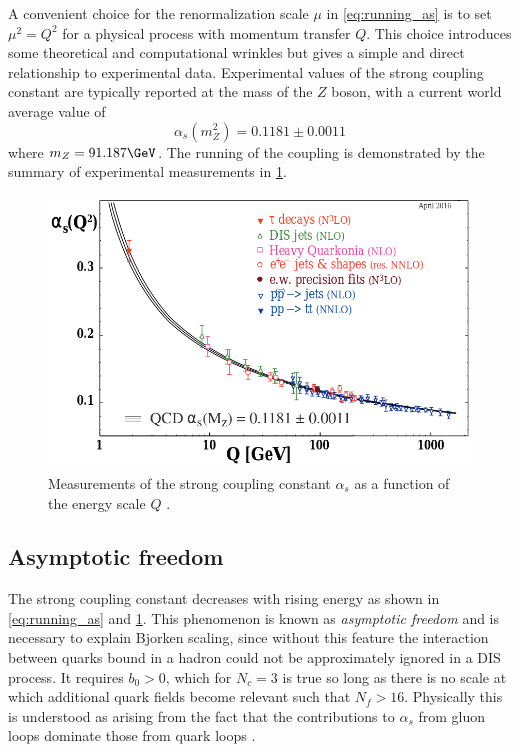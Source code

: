 A convenient choice for the renormalization scale $\mu$ in \cref{eq:running_as} is to set $\mu^2 = Q^2$ for a physical process with momentum transfer $Q$.
This choice introduces some theoretical and computational wrinkles but gives a simple and direct relationship to experimental data.
Experimental values of the strong coupling constant are typically reported at the mass of the $Z$ boson, with a current world average value of
\[
\alpha_s(m_Z^2) = 0.1181 \pm 0.0011
\]
where $m_Z = 91.187 \GeV$.
The running of the coupling is demonstrated by the summary of experimental measurements in \cref{fig:running_coupling}.

\begin{figure}[t]
  \includegraphics{running_as.png}
  \caption{Measurements of the strong coupling constant $\alpha_s$ as a function of the energy scale $Q$ \cite{Tanabashi:2018oca}.}
  \label{fig:running_coupling}
\end{figure}

\subsection{Asymptotic freedom}

The strong coupling constant decreases with rising energy as shown in \cref{eq:running_as} and \cref{fig:running_coupling}.
This phenomenon is known as \emph{asymptotic freedom} and is necessary to explain Bjorken scaling, since without this feature the interaction between quarks bound in a hadron could not be approximately ignored in a \ac{DIS} process.
It requires $b_0 > 0$, which for $N_c = 3$ \qcd is true so long as there is no scale at which additional quark fields become relevant such that $N_f > 16$.
Physically this is understood as arising from the fact that the contributions to $\alpha_s$ from gluon loops dominate those from quark loops \cite{Wilczek:2005az}.

